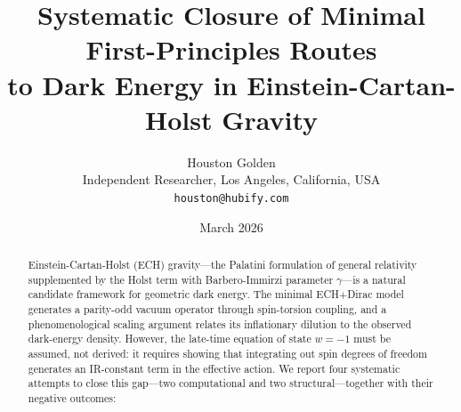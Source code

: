 \documentclass[11pt,letterpaper]{article}
\title{%
  Systematic Closure of Minimal First-Principles Routes\\
  to Dark Energy in Einstein-Cartan-Holst Gravity%
}
\author{Houston Golden\\
  Independent Researcher, Los Angeles, California, USA\\
  \texttt{houston@hubify.com}
}
\date{March 2026}
\newcommand{\BI}{\gamma}               %
\begin{document}
\maketitle

\begin{abstract}
Einstein-Cartan-Holst (ECH) gravity---the Palatini formulation of general
relativity supplemented by the Holst term with Barbero-Immirzi parameter
$\BI$---is a natural candidate framework for geometric dark energy. The
minimal ECH$+$Dirac model generates a parity-odd vacuum operator through
spin-torsion coupling, and a phenomenological scaling argument relates
its inflationary dilution to the observed dark-energy density. However,
the late-time equation of state $w=-1$ must be assumed, not derived: it
requires showing that integrating out spin degrees of freedom generates
an IR-constant term in the effective action. We report four systematic
attempts to close this gap---two computational and two structural---together
with their negative outcomes:


\end{abstract}
\end{document}
